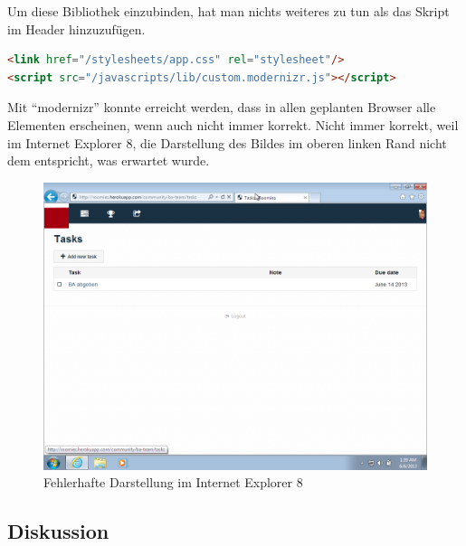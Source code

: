 Um diese Bibliothek einzubinden, hat man nichts weiteres zu tun als das Skript im Header hinzuzufügen.

\begin{lstlisting}[language=HTML, caption=Einbinden von modernizr \cite{roomiesLayout}, firstnumber=11, label=lst:mdernizrLayoutServer]
<link href="/stylesheets/app.css" rel="stylesheet"/>
<script src="/javascripts/lib/custom.modernizr.js"></script>
\end{lstlisting}

Mit ``modernizr'' konnte erreicht werden, dass in allen geplanten Browser alle Elementen erscheinen, wenn auch nicht immer korrekt. Nicht immer korrekt, weil im Internet Explorer 8, die Darstellung des Bildes im oberen linken Rand nicht dem entspricht, was erwartet wurde.

\begin{figure}[H]
	\centering
	\includegraphics[width=12cm]{content/principle-demonstration/images/progressive-enhancement-ie8.png}
	\caption{Fehlerhafte Darstellung im Internet Explorer 8}
	\label{fig:iossafari-datepicker}
\end{figure}

\subsection*{Diskussion}

